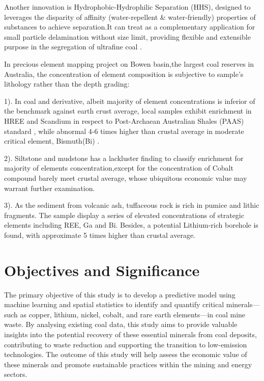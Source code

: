 \documentclass[11pt,a4paper,]{article}
\begin{document}
Another innovation is Hydrophobic-Hydrophilic Separation (HHS), designed to leverages the disparity of affinity (water-repellent \& water-friendly) properties of substances to achieve separation.It can treat as a complementary application for small particle delamination without size limit, providing flexible and extensible purpose in the segregation of ultrafine coal \textcite{Hodgkinson2021}.

In precious \textcite{Hodgkinson2020} element mapping project on Bowen basin,the largest coal reserves in Australia, the concentration of element composition is subjective to sample's lithology rather than the depth grading:

1). In coal and derivative, albeit majority of element concentrations is inferior of the benchmark against earth crust average, local samples exhibit enrichment in HREE and Scandium in respect to \textcite{McLennan2011} Post-Archaean Australian Shales (PAAS) standard , while abnormal 4-6 times higher than crustal average in moderate critical element, Bismuth(Bi) .

2). Siltstone and mudstone has a lackluster finding to classify enrichment for majority of elements concentration,except for the concentration of Cobalt compound barely meet crustal average, whose ubiquitous economic value may warrant further examination.

3). As the sediment from volcanic ash, tuffaceous rock is rich in pumice and lithic fragments. The sample display a series of elevated concentrations of strategic elements including REE, Ga and Bi. Besides, a potential Lithium-rich borehole is found, with approximate 5 times higher than crustal average.

\section{Objectives and Significance}\label{objectives-and-significance}

The primary objective of this study is to develop a predictive model using machine learning and spatial statistics to identify and quantify critical minerals---such as copper, lithium, nickel, cobalt, and rare earth elements---in coal mine waste. By analysing existing coal data, this study aims to provide valuable insights into the potential recovery of these essential minerals from coal deposits, contributing to waste reduction and supporting the transition to low-emission technologies. The outcome of this study will help assess the economic value of these minerals and promote sustainable practices within the mining and energy sectors.
\end{document}
